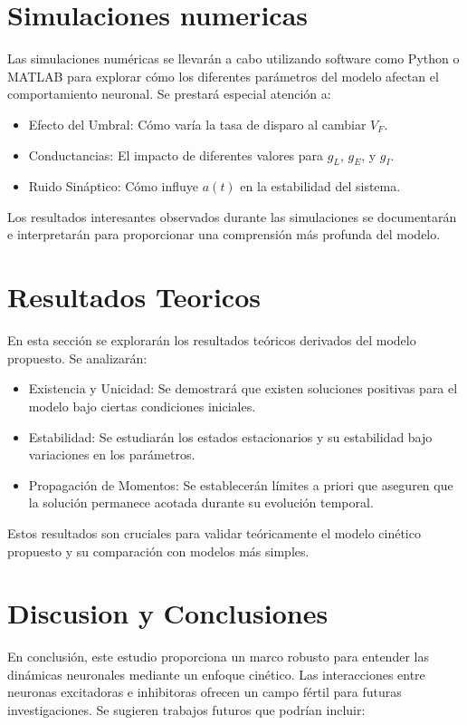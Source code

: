 \documentclass[10pt,twocolumn]{article}
\begin{document}
\section{Simulaciones numericas}
Las simulaciones numéricas se llevarán a cabo utilizando software como Python o MATLAB para explorar cómo los diferentes parámetros del modelo afectan el comportamiento neuronal. Se prestará especial atención a:

\begin{itemize}
    \item Efecto del Umbral: Cómo varía la tasa de disparo al cambiar $V_F$.
	\item Conductancias: El impacto de diferentes valores para $g_{L}$, $g_{E}$, y $g_{I}$.
	\item Ruido Sináptico: Cómo influye $a(t)$ en la estabilidad del sistema.
\end{itemize}
Los resultados interesantes observados durante las simulaciones se documentarán e interpretarán para proporcionar una comprensión más profunda del modelo.

\section{Resultados Teoricos}
En esta sección se explorarán los resultados teóricos derivados del modelo propuesto. Se analizarán:
\begin{itemize}
    \item Existencia y Unicidad: Se demostrará que existen soluciones positivas para el modelo bajo ciertas condiciones iniciales.
    \item Estabilidad: Se estudiarán los estados estacionarios y su estabilidad bajo variaciones en los parámetros.
    \item Propagación de Momentos: Se establecerán límites a priori que aseguren que la solución permanece acotada durante su evolución temporal.
\end{itemize}
Estos resultados son cruciales para validar teóricamente el modelo cinético propuesto y su comparación con modelos más simples.



\section{Discusion y Conclusiones}
En conclusión, este estudio proporciona un marco robusto para entender las dinámicas neuronales mediante un enfoque cinético. Las interacciones entre neuronas excitadoras e inhibitoras ofrecen un campo fértil para futuras investigaciones. Se sugieren trabajos futuros que podrían incluir:
\end{document}

